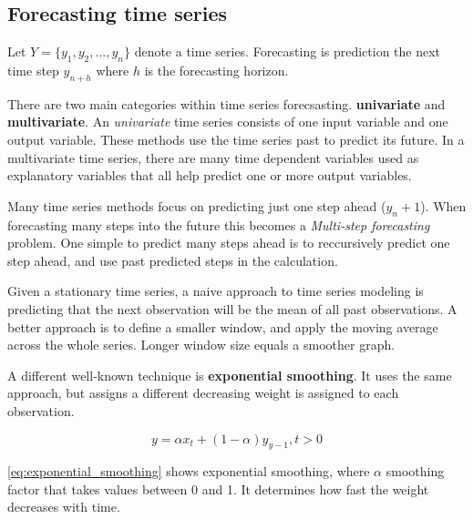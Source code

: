 \subsection{Forecasting time series}
\label{section:B&T:forecasting-time-series}
Let  $Y = \{y_1, y_2, ..., y_n\}$ denote a time series.
Forecasting is prediction the next time step $y_{n+h}$ where $h$ is the forecasting horizon.

There are two main categories within time series forecsasting. \textbf{univariate} and \textbf{multivariate}. 
An \textit{univariate} time series consists of one input variable and one output variable. These methods use the time series past to predict its future.
In a multivariate time series, there are many time dependent variables used as explanatory variables that all help predict one or more output variables.


Many time series methods focus on predicting just one step ahead ($y_n+1$). When forecasting many steps into the future this becomes a 
\textit{Multi-step forecasting} problem. One simple to predict many steps ahead is to reccursively predict one step ahead, and use past predicted steps 
in the calculation.


Given a stationary time series, a naive approach to time series modeling is predicting that the next observation will be the
mean of all past observations. A better approach is to define a smaller window, and
apply the moving average across the whole series. Longer window size equals a smoother graph.

A different well-known technique is \textbf{exponential smoothing}. It uses the same approach,
but assigns a different decreasing weight is assigned to each observation.

\begin{equation}
    \label{eq:exponential_smoothing}
    y = \alpha x_t + (1 - \alpha)y_{y-1}, t > 0
\end{equation}

\autoref{eq:exponential_smoothing}
shows exponential smoothing, where $\alpha$ smoothing factor
that takes values between 0 and 1. It determines how fast the weight decreases with time.





